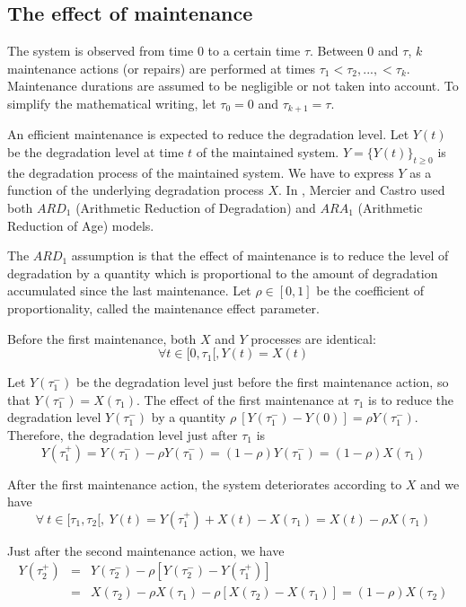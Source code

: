 \subsection{The effect of maintenance} 
\label{section:maintenance}

The system is observed from time 0 to a certain time $\tau$. Between 0 and $\tau$, $k$ maintenance actions (or repairs) are performed at times $\tau_1 <\tau_2,...,<\tau_k$. Maintenance durations are assumed to be negligible or not taken into account. To simplify the mathematical writing, let $\tau_0=0$ and $\tau_{k+1}=\tau$.

An efficient maintenance is expected to reduce the degradation level. Let $Y(t)$ be the degradation level at time $t$ of the maintained system. $Y=\{Y(t)\}_{t\geq 0}$ is the degradation process of the maintained system. We have to express $Y$ as a function of the underlying degradation process $X$. In \cite{mercier_stochastic_2019}, Mercier and Castro used both $ARD_1$ (Arithmetic Reduction of Degradation) and $ARA_1$ (Arithmetic Reduction of Age) models. 

The $ARD_1$ assumption is that the effect of maintenance is to reduce the level of degradation by a quantity which is proportional to the amount of degradation accumulated since the last maintenance. Let $\rho \in [0,1]$ be the coefficient of proportionality, called the maintenance effect parameter.

Before the first maintenance, both $X$ and $Y$ processes are identical:
$$\forall t\in [0,\tau_1[, Y(t)=X(t)$$

Let $Y(\tau_1^-)$ be the degradation level just before the first maintenance action, so that $Y(\tau_1^-)=X(\tau_1)$.
The effect of the first maintenance at $\tau_1$ is to reduce the degradation level $Y(\tau_1^-)$ by a quantity $\rho \ \left[ Y(\tau_1^-)- Y(0)\right]=\rho Y(\tau_1^-)$. Therefore, the degradation level just after $\tau_1$ is
\begin{equation}
Y(\tau_1^+)=Y(\tau_1^-)- \rho Y(\tau_1^-)=(1-\rho) Y(\tau_1^-)=(1-\rho) X(\tau_1)
\label{eq:Ytau1+}
\end{equation}

After the first maintenance action, the system deteriorates according to $X$ and we have 
$$\forall\ t\in [\tau_1,\tau_2[,\ Y(t)=Y(\tau_1^+)+ X(t)-X(\tau_1)=X(t)-\rho X(\tau_1)$$

\noindent Just after the second maintenance action, we have
\begin{eqnarray}
Y(\tau_2^+) &=& Y(\tau_2^-) - \rho [Y(\tau_2^-) - Y(\tau_1^+)] \label{eq:Ytau2+}\\
&=& X(\tau_2)-\rho X(\tau_1) - \rho [X(\tau_2)-X(\tau_1)] = (1-\rho) X(\tau_2) \nonumber
\end{eqnarray}

